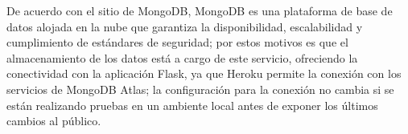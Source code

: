 De acuerdo con el sitio de MongoDB\cite{mongodb_mongodb_2020}, MongoDB es una plataforma de base de datos alojada en la nube que garantiza la disponibilidad, escalabilidad y cumplimiento de estándares de seguridad; por estos motivos es que el almacenamiento de los datos está a cargo de este servicio, ofreciendo la conectividad con la aplicación Flask, ya que Heroku permite la conexión con los servicios de MongoDB Atlas; la configuración para la conexión no cambia si se están realizando pruebas en un ambiente local antes de exponer los últimos cambios al público.